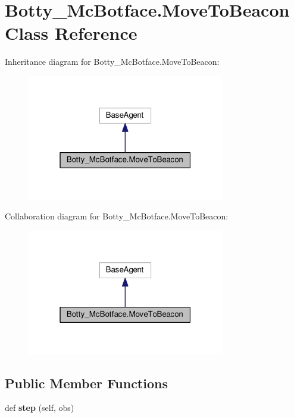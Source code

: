 \hypertarget{classBotty__McBotface_1_1MoveToBeacon}{}\section{Botty\+\_\+\+Mc\+Botface.\+Move\+To\+Beacon Class Reference}
\label{classBotty__McBotface_1_1MoveToBeacon}


Inheritance diagram for Botty\+\_\+\+Mc\+Botface.\+Move\+To\+Beacon\+:\nopagebreak
\begin{figure}[H]
\begin{center}
\leavevmode
\includegraphics[width=244pt]{classBotty__McBotface_1_1MoveToBeacon__inherit__graph}
\end{center}
\end{figure}


Collaboration diagram for Botty\+\_\+\+Mc\+Botface.\+Move\+To\+Beacon\+:\nopagebreak
\begin{figure}[H]
\begin{center}
\leavevmode
\includegraphics[width=244pt]{classBotty__McBotface_1_1MoveToBeacon__coll__graph}
\end{center}
\end{figure}
\subsection*{Public Member Functions}
\begin{DoxyCompactItemize}
\item 
def {\bfseries step} (self, obs)\hypertarget{classBotty__McBotface_1_1MoveToBeacon_a4a6512d538e2f3db2cd2b0a2e9478258}{}\label{classBotty__McBotface_1_1MoveToBeacon_a4a6512d538e2f3db2cd2b0a2e9478258}

\end{DoxyCompactItemize}


